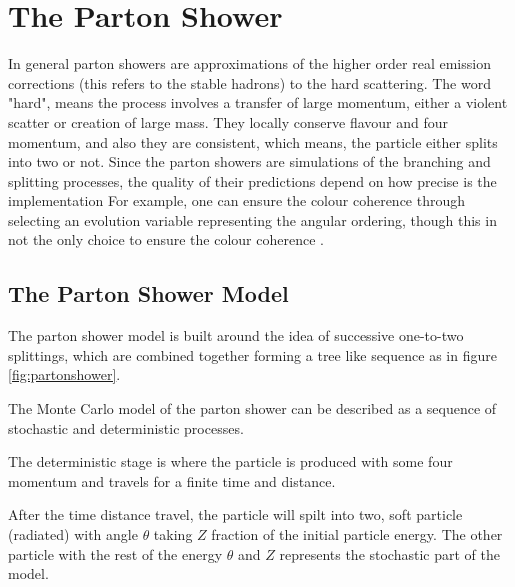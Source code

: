 \chapter{The Parton Shower}

In general parton showers are approximations of the higher order real emission corrections (this refers to the stable hadrons) to the hard scattering. The word "hard", means the process involves a transfer of large momentum, either a violent scatter or creation of large mass. They locally conserve flavour and four momentum, and also they are consistent, which means, the particle either splits into two or not. 
Since the parton showers are simulations of the branching and splitting processes, the quality of their predictions depend on how precise is the implementation For example, one can ensure the colour coherence through selecting an evolution variable representing the angular ordering, though this in not the only choice to ensure the colour coherence \citep{introduction}. 

\section{The Parton Shower Model}
The parton shower model is built around the idea of successive one-to-two splittings, which are combined together forming a tree like sequence as in figure \ref{fig:partonshower}. 

The Monte Carlo model of the parton shower can be described as a sequence of stochastic and deterministic processes. 

The deterministic stage is where the particle is produced with some four momentum and travels for a finite time and distance.

After the time distance travel, the particle will spilt into two, soft particle (radiated) with angle $\theta$ taking $Z$ fraction of the initial particle energy. The other particle with the rest of the energy $\theta$ and $Z$ represents the stochastic part of the model. 


